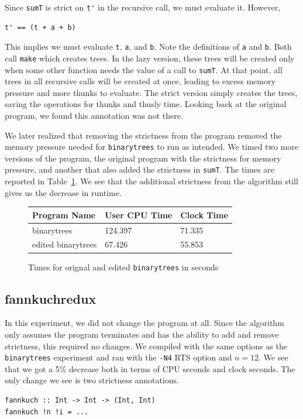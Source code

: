 \documentclass[preprint,nocopyrightspace]{sigplanconf}
\begin{document}
Since \lstinline!sumT! is strict on \lstinline!t'! in the recursive call, we must evaluate it. However,
\begin{lstlisting}
t' == (t + a + b)
\end{lstlisting}
This implies we must evaluate \lstinline!t!, \lstinline!a!, and \lstinline!b!. Note the definitions of \lstinline!a! and \lstinline!b!. Both call \lstinline!make! which creates trees. In the lazy version, these trees will be created only when some other function needs the value of a call to \lstinline!sumT!. At that point, all trees in all recursive calls will be created at once, leading to excess memory pressure and more thunks to evaluate. The strict version simply creates the trees, saving the operations for thunks and thusly time. Looking back at the original program, we found this annotation was not there. 

We later realized that removing the strictness from the program removed the memory pressure needed for \lstinline!binarytrees! to run as intended. We timed two more versions of the program, the original program with the strictness for memory pressure, and another that also added the strictness in \lstinline!sumT!. The times are reported in Table~\ref{tab:btree}. We see that the additional strictness from the algorithm still gives us the decrease in runtime.
\begin{figure}[t]
\label{tab:btree}
\begin{tabular}{| l | l | l |}
\hline
Program Name & User CPU Time & Clock Time\\
\hline
binarytrees & 124.397 & 71.335\\
\hline
edited binarytrees & 67.426 & 55.853\\
\hline
\end{tabular}
\caption{Times for orignal and edited \lstinline!binarytrees! in seconds}
\end{figure}
\subsection{fannkuchredux}
In this experiment, we did not change the program at all. Since the algorithm only assumes the program terminates and has the ability to add and remove strictness, this required no changes. We compiled with the same options as the \lstinline!binarytrees! experiment and ran with the \lstinline!-N4! RTS option and $n = 12$. We see that we got a 5\% decrease both in terms of CPU seconds and clock seconds. The only change we see is two strictness annotations.
\begin{lstlisting}
fannkuch :: Int -> Int -> (Int, Int)
fannkuch !n !i = ...
\end{lstlisting}
\end{document}

